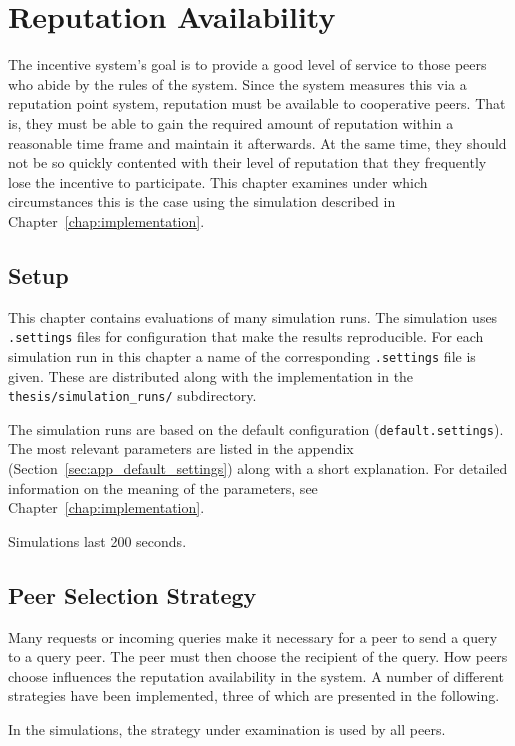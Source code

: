 \chapter{Reputation Availability}
\label{chap:rep_avail}
The incentive system's goal is to provide a good level of service to those peers
who abide by the rules of the system. Since the system measures this via a
reputation point system, reputation must be available to cooperative peers.
That is, they must be able to gain the required amount of reputation within a
reasonable time frame and maintain it afterwards. At the same time, they should
not be so quickly contented with their level of reputation that they frequently
lose the incentive to participate. This chapter examines under which
circumstances this is the case using the simulation described in
Chapter~\ref{chap:implementation}.

\section{Setup}
This chapter contains evaluations of many simulation runs. The simulation uses
\texttt{.settings} files for configuration that make the results reproducible.
For each simulation run in this chapter a name of the corresponding
\texttt{.settings} file is given. These are distributed along with the
implementation in the \texttt{thesis/simulation\_runs/} subdirectory.

The simulation runs are based on the default configuration
(\texttt{default.settings}). The most relevant parameters are listed in the
appendix (Section~\ref{sec:app_default_settings}) along with a short
explanation. For detailed information on the meaning of the parameters, see
Chapter~\ref{chap:implementation}.

Simulations last 200 seconds.

\section{Peer Selection Strategy}
\label{sec:selection}
Many requests or incoming queries make it necessary for a peer to send a query
to a query peer. The peer must then choose the recipient of the query. How peers
choose influences the reputation availability in the system. A number of
different strategies have been implemented, three of which are presented in the
following.

In the simulations, the strategy under examination is used by all peers.


